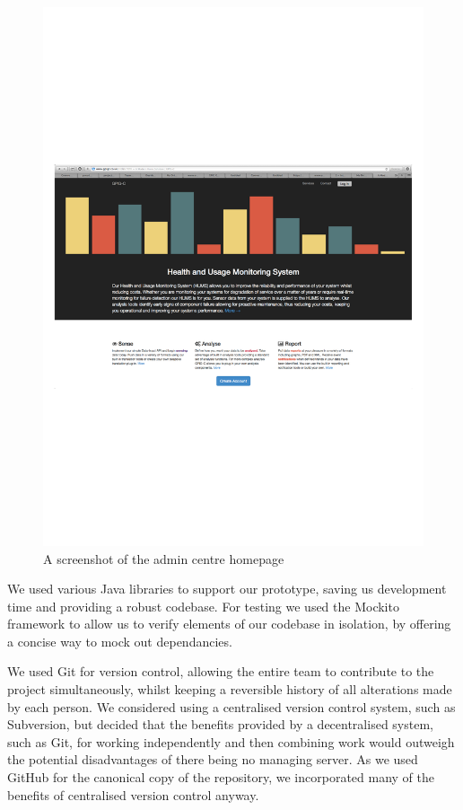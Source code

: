 \documentclass[10pt,a4paper]{article}
\begin{document}
\begin{figure}[h!]
  \centering
  \includegraphics[width=15cm]{images/admin.pdf}
  \caption{A screenshot of the admin centre homepage}
  \label{fig:admin}
\end{figure}

We used various Java libraries to support our prototype, saving us 
development time and providing a robust codebase. For testing we used 
the Mockito framework to allow us to verify elements of our codebase in 
isolation, by offering a concise way to mock out dependancies.

We used Git for version control, allowing the entire team to
contribute to the project simultaneously, whilst keeping a reversible
history of all alterations made by each person. We considered using a
centralised version control system, such as Subversion, but decided that the
benefits provided by a decentralised system, such as Git, for working
independently and then combining work would outweigh the potential
disadvantages of there being no managing server. As we used GitHub for the
canonical copy of the repository, we incorporated many of the benefits of centralised
version control anyway.
\end{document}
